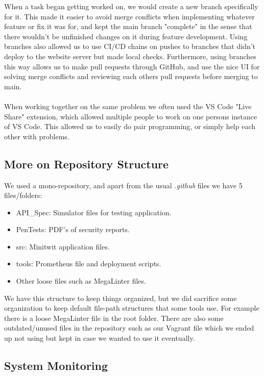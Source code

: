 When a task began getting worked on, we would create a new branch specifically for it. This made it easier to avoid merge conflicts when implementing whatever feature or fix it was for, and kept the main branch "complete" in the sense that there wouldn't be unfinished changes on it during feature development. Using branches also allowed us to use CI/CD chains on pushes to branches that didn't deploy to the website server but made local checks. Furthermore, using branches this way allows us to make pull requests through GitHub, and use the nice UI for solving merge conflicts and reviewing each others pull requests before merging to main.
\\\\
When working together on the same problem we often used the VS Code "Live Share" extension, which allowed multiple people to work on one persons instance of VS Code. This allowed us to easily do pair programming, or simply help each other with problems.

\subsection*{More on Repository Structure}

We used a mono-repository, and apart from the usual \textit{.github} files we have 5 files/folders:

\begin{itemize}
    \item API\_Spec: Simulator files for testing application.
    \item PenTests: PDF's of security reports.
    \item src: Minitwit application files.
    \item tools: Prometheus file and deployment scripts.
    \item Other loose files such as MegaLinter files.
\end{itemize}

We have this structure to keep things organized, but we did sacrifice some organization to keep default file-path structures that some tools use. For example there is a loose MegaLinter file in the root folder. There are also some outdated/unused files in the repository such as our Vagrant file which we ended up not using but kept in case we wanted to use it eventually.

\subsection*{System Monitoring}

